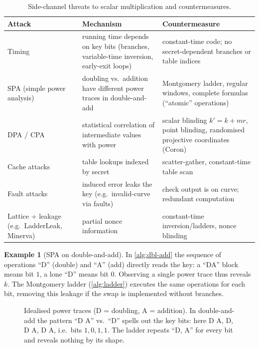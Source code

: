 \documentclass[11pt,a4paper,oneside]{book}
\theoremstyle{plain}
\theoremstyle{definition}
\newtheorem{example}[theorem]{Example}
\theoremstyle{remark}
\begin{document}
\begin{table}[ht]
\centering\small
\caption{Side-channel threats to scalar multiplication and countermeasures.}
\begin{tabular}{@{}p{3.2cm}p{5.2cm}p{5.2cm}@{}}
\toprule
Attack & Mechanism & Countermeasure\\
\midrule
Timing & running time depends on key bits (branches, variable-time inversion, early-exit loops) & constant-time code; no secret-dependent branches or table indices\\
SPA (simple power analysis) & doubling vs.\ addition have different power traces in double-and-add & Montgomery ladder, regular windows, complete formulas (``atomic'' operations)\\
DPA / CPA & statistical correlation of intermediate values with power & scalar blinding $k'=k+mr$, point blinding, randomised projective coordinates (Coron)\\
Cache attacks & table lookups indexed by secret & scatter-gather, constant-time table scan\\
Fault attacks & induced error leaks the key (e.g.\ invalid-curve via faults) & check output is on curve; redundant computation\\
Lattice + leakage (e.g.\ LadderLeak, Minerva) & partial nonce information & constant-time inversion/ladders, nonce blinding\\
\bottomrule
\end{tabular}
\end{table}

\begin{example}[SPA on double-and-add]
In \cref{alg:dbl-add} the sequence of operations ``D'' (double) and ``A'' (add) directly reads the key: a ``DA'' block means bit $1$, a lone ``D'' means bit $0$. Observing a single power trace thus reveals $k$. The Montgomery ladder (\cref{alg:ladder}) executes the same operations for each bit, removing this leakage if the swap is implemented without branches.
\end{example}

\begin{figure}[ht]
\centering
{}
\caption{Idealised power traces (D = doubling, A = addition). In double-and-add the pattern ``D A'' vs.\ ``D'' spells out the key bits: here D A, D, D A, D A, i.e.\ bits $1,0,1,1$. The ladder repeats ``D, A'' for every bit and reveals nothing by its shape.}
\end{figure}
\end{document}
